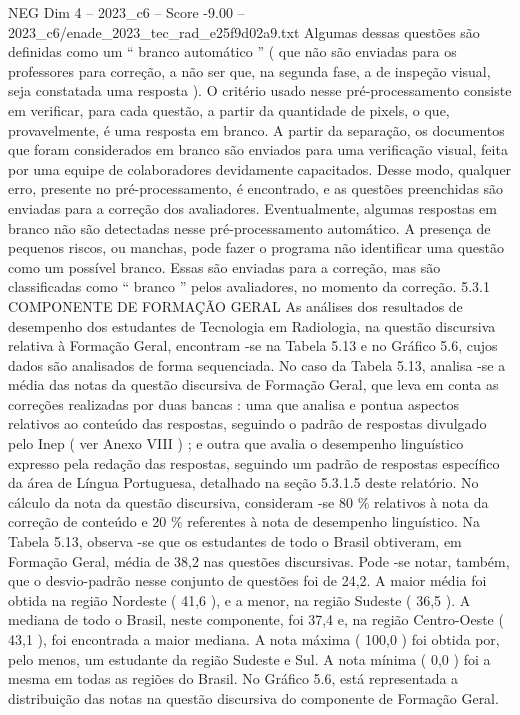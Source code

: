 \begin{textsample}{NEG Dim 4 – 2023\_c6 – Score -9.00 – 2023\_c6/enade\_2023\_tec\_rad\_e25f9d02a9.txt}
Algumas dessas questões são definidas como um “ branco automático ” ( que não são enviadas para os professores para correção, a não ser que, na segunda fase, a de inspeção visual, seja constatada uma resposta ).
O critério usado nesse pré-processamento consiste em verificar, para cada questão, a partir da quantidade de pixels, o que, provavelmente, é uma resposta em branco.
A partir da separação, os documentos que foram considerados em branco são enviados para uma verificação visual, feita por uma equipe de colaboradores devidamente capacitados.
Desse modo, qualquer erro, presente no pré-processamento, é encontrado, e as questões preenchidas são enviadas para a correção dos avaliadores.
Eventualmente, algumas respostas em branco não são detectadas nesse pré-processamento automático.
A presença de pequenos riscos, ou manchas, pode fazer o programa não identificar uma questão como um possível branco.
Essas são enviadas para a correção, mas são classificadas como “ branco ” pelos avaliadores, no momento da correção. 5.3.1 COMPONENTE DE FORMAÇÃO GERAL As análises dos resultados de desempenho dos estudantes de Tecnologia em Radiologia, na questão discursiva relativa à Formação Geral, encontram -se na Tabela 5.13 e no Gráfico 5.6, cujos dados são analisados de forma sequenciada.
No caso da Tabela 5.13, analisa -se a média das notas da questão discursiva de Formação Geral, que leva em conta as correções realizadas por duas bancas : uma que analisa e pontua aspectos relativos ao conteúdo das respostas, seguindo o padrão de respostas divulgado pelo Inep ( ver Anexo VIII ) ; e outra que avalia o desempenho linguístico expresso pela redação das respostas, seguindo um padrão de respostas específico da área de Língua Portuguesa, detalhado na seção 5.3.1.5 deste relatório.
No cálculo da nota da questão discursiva, consideram -se 80 \% relativos à nota da correção de conteúdo e 20 \% referentes à nota de desempenho linguístico.
Na Tabela 5.13, observa -se que os estudantes de todo o Brasil obtiveram, em Formação Geral, média de 38,2 nas questões discursivas.
Pode -se notar, também, que o desvio-padrão nesse conjunto de questões foi de 24,2.
A maior média foi obtida na região Nordeste ( 41,6 ), e a menor, na região Sudeste ( 36,5 ).
A mediana de todo o Brasil, neste componente, foi 37,4 e, na região Centro-Oeste ( 43,1 ), foi encontrada a maior mediana.
A nota máxima ( 100,0 ) foi obtida por, pelo menos, um estudante da região Sudeste e Sul.
A nota mínima ( 0,0 ) foi a mesma em todas as regiões do Brasil.
No Gráfico 5.6, está representada a distribuição das notas na questão discursiva do componente de Formação Geral.

\end{textsample}
